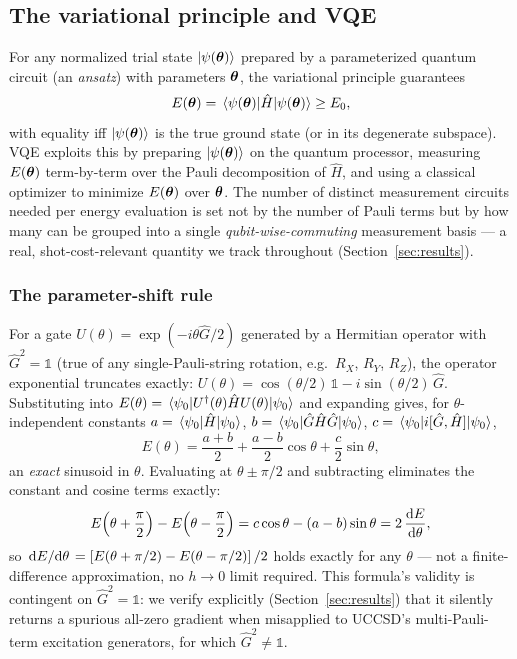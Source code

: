 \documentclass[11pt]{article}
\begin{document}
\subsection{The variational principle and VQE}

For any normalized trial state $\ket{\psi(\vb*{\theta})}$ prepared by a
parameterized quantum circuit (an \emph{ansatz}) with parameters
$\vb*{\theta}$, the variational principle guarantees
\begin{equation}
  E(\vb*{\theta}) = \expval{\hat{H}}{\psi(\vb*{\theta})} \geq E_0,
\end{equation}
with equality iff $\ket{\psi(\vb*{\theta})}$ is the true ground state (or in
its degenerate subspace). VQE exploits this by preparing
$\ket{\psi(\vb*{\theta})}$ on the quantum processor, measuring
$E(\vb*{\theta})$ term-by-term over the Pauli decomposition of $\hat{H}$, and
using a classical optimizer to minimize $E(\vb*{\theta})$ over $\vb*{\theta}$.
The number of distinct measurement circuits needed per energy evaluation is
set not by the number of Pauli terms but by how many can be grouped into a
single \emph{qubit-wise-commuting} measurement basis --- a real,
shot-cost-relevant quantity we track throughout (Section~\ref{sec:results}).

\subsubsection{The parameter-shift rule}
\label{subsec:paramshift}

For a gate $U(\theta) = \exp(-i\theta \hat{G}/2)$ generated by a Hermitian
operator with $\hat{G}^2 = \mathbb{1}$ (true of any single-Pauli-string
rotation, e.g.\ $R_X$, $R_Y$, $R_Z$), the operator exponential truncates
exactly: $U(\theta) = \cos(\theta/2)\,\mathbb{1} - i\sin(\theta/2)\,\hat{G}$.
Substituting into $E(\theta) = \expval{U^\dagger(\theta)\hat{H}U(\theta)}{\psi_0}$
and expanding gives, for $\theta$-independent constants
$a = \expval{\hat H}{\psi_0}$, $b = \expval{\hat G\hat H\hat G}{\psi_0}$,
$c = \expval{i[\hat G,\hat H]}{\psi_0}$,
\begin{equation}
  E(\theta) = \frac{a+b}{2} + \frac{a-b}{2}\cos\theta + \frac{c}{2}\sin\theta,
\end{equation}
an \emph{exact} sinusoid in $\theta$. Evaluating at $\theta \pm \pi/2$ and
subtracting eliminates the constant and cosine terms exactly:
\begin{equation}
  E\!\left(\theta+\frac{\pi}{2}\right) - E\!\left(\theta-\frac{\pi}{2}\right)
  = c\cos\theta - (a-b)\sin\theta = 2\,\dv{E}{\theta},
\end{equation}
so $\dv*{E}{\theta} = \left[E(\theta+\pi/2) - E(\theta-\pi/2)\right]/2$ holds
exactly for any $\theta$ --- not a finite-difference approximation, no
$h\to 0$ limit required. This formula's validity is contingent on
$\hat G^2=\mathbb{1}$: we verify explicitly (Section~\ref{sec:results}) that it
silently returns a spurious all-zero gradient when misapplied to UCCSD's
multi-Pauli-term excitation generators, for which $\hat G^2 \neq \mathbb{1}$.
\end{document}
